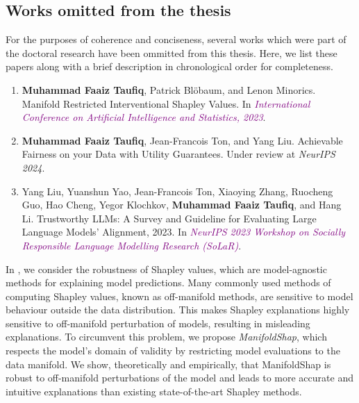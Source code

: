 \subsection{Works omitted from the thesis}
For the purposes of coherence and conciseness, several works which were part of the doctoral research have been ommitted from this thesis. 
Here, we list these papers along with a brief description in chronological order for completeness. 
\begin{enumerate}
    \item \textbf{Muhammad Faaiz Taufiq}, Patrick Blöbaum, and Lenon Minorics. Manifold Restricted
    Interventional Shapley Values. In \textit{\textcolor{purple}{International Conference on Artificial Intelligence and
    Statistics, 2023}}.  \citep{taufiq2023manifold}
    \item  \textbf{Muhammad Faaiz Taufiq}, Jean-Francois Ton, and Yang Liu. Achievable Fairness on your Data
    with Utility Guarantees. Under review at \textit{NeurIPS 2024}. \citep{taufiq2024achievablefairnessdatautility}
    \item Yang Liu, Yuanshun Yao, Jean-Francois Ton, Xiaoying Zhang, Ruocheng Guo, Hao Cheng, Yegor
    Klochkov, \textbf{Muhammad Faaiz Taufiq}, and Hang Li. 
    Trustworthy LLMs: A Survey and Guideline for Evaluating Large Language Models' Alignment, 2023. 
    In \textit{\textcolor{purple}{NeurIPS 2023 Workshop on Socially Responsible Language Modelling Research (SoLaR)}}.    
    \citep{liu2024trustworthyllmssurveyguideline}
\end{enumerate}
In \cite{taufiq2023manifold}, we consider the robustness of Shapley values, which are model-agnostic methods for explaining model predictions.
Many commonly used methods of computing Shapley values, known as off-manifold methods, are sensitive to model behaviour outside the data distribution.
This makes Shapley explanations highly sensitive to off-manifold perturbation of models, resulting in misleading explanations.
To circumvent this problem, we propose \emph{ManifoldShap}, which respects the model’s domain of validity by restricting model evaluations to the data manifold.
We show, theoretically and empirically, that ManifoldShap is robust to off-manifold perturbations of the model and leads to
more accurate and intuitive explanations than existing state-of-the-art Shapley methods.

